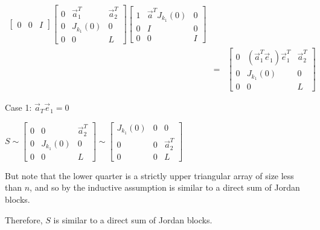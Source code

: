 \documentclass[letterpaper,12pt,fleqn]{article}
\newcommand{\va}{\vec{a}}
\newcommand{\ve}{\vec{e}}
\begin{document}
\begin{theproof}
\begin{description}
\begin{eqnarray*}
\begin{bmatrix}
        0 & 0 & I
      \end{bmatrix}
      \begin{bmatrix}
        0 & \va_1^T & \va_2^T \\
        0 & J_{k_1}(0) & 0 \\
        0 & 0 & L
      \end{bmatrix}
      \begin{bmatrix}
        1 & \va^TJ_{k_1}(0) & 0 \\
        0 & I & 0 \\
        0 & 0 & I
      \end{bmatrix} \\
      &=& \begin{bmatrix}
        0 & (\va_1^T\ve_1)\ve_1^T & \va_2^T \\
        0 & J_{k_1}(0) & 0 \\
        0 & 0 & L
      \end{bmatrix}
    \end{eqnarray*}
    \begin{description}
    \item Case 1: $\va_T\ve_1=0$
      
      $S\sim\begin{bmatrix}
      0 & 0 & \va_2^T \\
      0 & J_{k_1}(0) & 0 \\
      0 & 0 & L
    \end{bmatrix}\sim\left[\begin{array}{c|cc}
        J_{k_1}(0) & 0 & 0 \\
        \hline
        0 & 0 & \va_2^T \\
        0 & 0 & L
      \end{array}\right]$

      But note that the lower quarter is a strictly upper triangular array of size
      less than $n$, and so by the inductive assumption is similar to a direct sum of
      Jordan blocks.

      Therefore, $S$ is similar to a direct sum of Jordan blocks.


\end{description}
\end{description}
\end{theproof}
\end{document}
